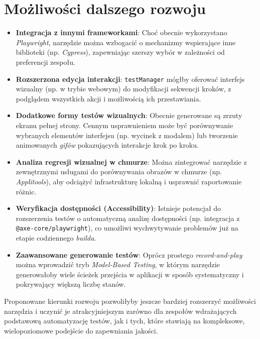 \documentclass[12pt]{report}
\begin{document}
\section{Możliwości dalszego rozwoju}
\begin{itemize}
    \item \textbf{Integracja z innymi frameworkami}: Choć obecnie wykorzystano \emph{Playwright}, narzędzie można wzbogacić o mechanizmy wspierające inne biblioteki (np. \emph{Cypress}), zapewniając szerszy wybór w zależności od preferencji zespołu.
    \item \textbf{Rozszerzona edycja interakcji}: \texttt{testManager} mógłby oferować interfejs wizualny (np. w trybie webowym) do modyfikacji sekwencji kroków, z podglądem wszystkich akcji i możliwością ich przestawiania.
    \item \textbf{Dodatkowe formy testów wizualnych}: Obecnie generowane są zrzuty ekranu pełnej strony. Cennym usprawnieniem może być porównywanie wybranych elementów interfejsu (np. wycinek z modalem) lub tworzenie animowanych \emph{gifów} pokazujących interakcje krok po kroku.
    \item \textbf{Analiza regresji wizualnej w chmurze}: Można zintegrować narzędzie z zewnętrznymi usługami do porównywania obrazów w chmurze (np. \emph{Applitools}), aby odciążyć infrastrukturę lokalną i usprawnić raportowanie różnic.
    \item \textbf{Weryfikacja dostępności (Accessibility)}: Istnieje potencjał do rozszerzenia testów o automatyczną analizę dostępności (np. integracja z \texttt{@axe-core/playwright}), co umożliwi wychwytywanie problemów już na etapie codziennego \emph{builda}.
    \item \textbf{Zaawansowane generowanie testów}: Oprócz prostego \emph{record-and-play} można wprowadzić tryb \emph{Model-Based Testing}, w którym narzędzie generowałoby wiele ścieżek przejścia w aplikacji w sposób systematyczny i pokrywający większą liczbę stanów.
\end{itemize}

Proponowane kierunki rozwoju pozwoliłyby jeszcze bardziej rozszerzyć możliwości narzędzia i uczynić je atrakcyjniejszym zarówno dla zespołów wdrażających podstawową automatyzację testów, jak i tych, które stawiają na kompleksowe, wielopoziomowe podejście do zapewniania jakości.

\cleardoublepage
{}
{}
\listoffigures
\end{document}
